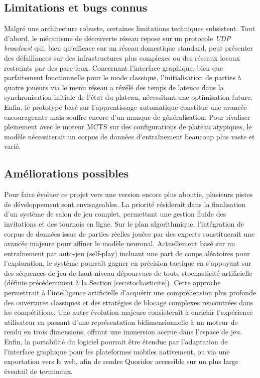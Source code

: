\documentclass[a4paper]{article}
\begin{document}
\subsection{Limitations et bugs connus}

Malgré une architecture robuste, certaines limitations techniques subsistent. Tout d'abord, le mécanisme de découverte réseau repose sur un protocole \emph{UDP broadcast} qui, bien qu'efficace sur un réseau domestique standard, peut présenter des défaillances sur des infrastructures plus complexes ou des réseaux locaux restreints par des pare-feux. Concernant l'interface graphique, bien que parfaitement fonctionnelle pour le mode classique, l'initialisation de parties à quatre joueurs via le menu réseau a révélé des temps de latence dans la synchronisation initiale de l'état du plateau, nécessitant une optimisation future. Enfin, le prototype basé sur l'apprentissage automatique constitue une avancée encourageante mais souffre encore d'un manque de généralisation. Pour rivaliser pleinement avec le moteur MCTS sur des configurations de plateau atypiques, le modèle nécessiterait un corpus de données d'entraînement beaucoup plus vaste et varié.

\subsection{Améliorations possibles}

Pour faire évoluer ce projet vers une version encore plus aboutie, plusieurs pistes de développement sont envisageables. La priorité résiderait dans la finalisation d'un système de salon de jeu complet, permettant une gestion fluide des invitations et des tournois en ligne. Sur le plan algorithmique, l'intégration de corpus de données issus de parties réelles jouées par des experts constituerait une avancée majeure pour affiner le modèle neuronal. Actuellement basé sur un entraînement par auto-jeu (self-play) incluant une part de coups aléatoires pour l'exploration, le système pourrait gagner en précision tactique en s'appuyant sur des séquences de jeu de haut niveau dépourvues de toute stochasticité artificielle (définie précédemment à la Section \ref{sec:stochasticite}). Cette approche permettrait à l'intelligence artificielle d'acquérir une compréhension plus profonde des ouvertures classiques et des stratégies de blocage complexes rencontrées dans les compétitions. Une autre évolution majeure consisterait à enrichir l'expérience utilisateur en passant d'une représentation bidimensionnelle à un moteur de rendu en trois dimensions, offrant une immersion accrue dans l'espace de jeu. Enfin, la portabilité du logiciel pourrait être étendue par l'adaptation de l'interface graphique pour les plateformes mobiles nativement, ou via une exportation vers le web, afin de rendre Quoridor accessible sur un plus large éventail de terminaux.
\end{document}
